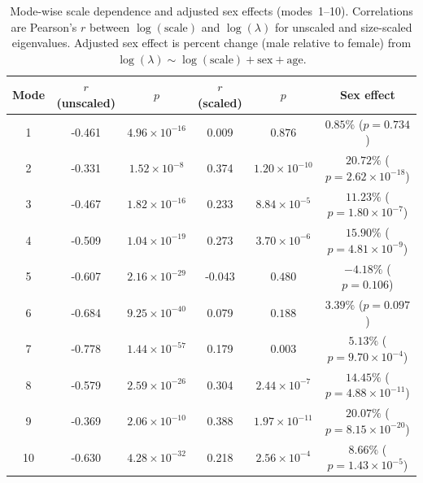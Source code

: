\documentclass[openacc]{rsproca_new}
\begin{document}
\begin{table}[p]\centering
\caption{Mode-wise scale dependence and adjusted sex effects (modes~1--10). Correlations are Pearson's $r$ between $\log(\mathrm{scale})$ and $\log(\lambda)$ for unscaled and size-scaled eigenvalues. Adjusted sex effect is percent change (male relative to female) from $\log(\lambda) \sim \log(\mathrm{scale}) + \mathrm{sex} + \mathrm{age}$.}
\begin{tabular}{cccccc}\toprule
Mode & $r$ (unscaled) & $p$ & $r$ (scaled) & $p$ & Sex effect \\\midrule
1 & -0.461 & $4.96 \times 10^{-16}$ & 0.009 & $0.876$ & $0.85\%$ ($p=0.734$) \\
2 & -0.331 & $1.52 \times 10^{-8}$ & 0.374 & $1.20 \times 10^{-10}$ & $20.72\%$ ($p=2.62 \times 10^{-18}$) \\
3 & -0.467 & $1.82 \times 10^{-16}$ & 0.233 & $8.84 \times 10^{-5}$ & $11.23\%$ ($p=1.80 \times 10^{-7}$) \\
4 & -0.509 & $1.04 \times 10^{-19}$ & 0.273 & $3.70 \times 10^{-6}$ & $15.90\%$ ($p=4.81 \times 10^{-9}$) \\
5 & -0.607 & $2.16 \times 10^{-29}$ & -0.043 & $0.480$ & $-4.18\%$ ($p=0.106$) \\
6 & -0.684 & $9.25 \times 10^{-40}$ & 0.079 & $0.188$ & $3.39\%$ ($p=0.097$) \\
7 & -0.778 & $1.44 \times 10^{-57}$ & 0.179 & $0.003$ & $5.13\%$ ($p=9.70 \times 10^{-4}$) \\
8 & -0.579 & $2.59 \times 10^{-26}$ & 0.304 & $2.44 \times 10^{-7}$ & $14.45\%$ ($p=4.88 \times 10^{-11}$) \\
9 & -0.369 & $2.06 \times 10^{-10}$ & 0.388 & $1.97 \times 10^{-11}$ & $20.07\%$ ($p=8.15 \times 10^{-20}$) \\
10 & -0.630 & $4.28 \times 10^{-32}$ & 0.218 & $2.56 \times 10^{-4}$ & $8.66\%$ ($p=1.43 \times 10^{-5}$) \\
\bottomrule\end{tabular}\end{table}
\end{document}
